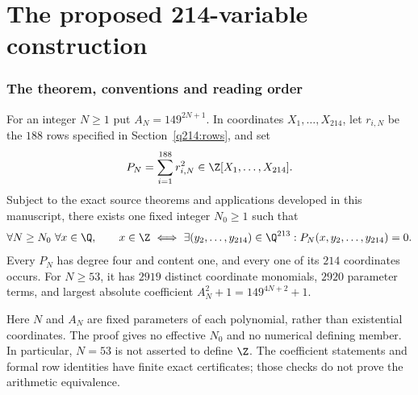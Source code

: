 \maketitle
\begin{abstract}
We present the proposed $214$-variable quartic family obtained by reciprocal
clearing on the shared-trace $224$-coordinate predecessor.  For the fixed
coefficient $A_N=149^{2N+1}$, the polynomial is the sum of squares of $188$
primitive integral quadratic residuals, all printed below.  The proposed
arithmetic conclusion is uniform for every $N$ beyond one fixed ineffective
threshold.  The complete new local, modularity, height and existence arguments
are followed by the full current Version~16 mathematical foundation, including
the inherited elliptic, scalar, prime-selection, pole and aggregate arguments.
The exact coefficient calculation gives $2919$ coordinate monomials, $2920$
parameter terms and height $149^{4N+2}+1$ for $N\ge53$; this is only a
coefficient threshold.  This assembled manuscript is an author proposal for
fresh review and does not itself confer Protocol~D or release acceptance.
\end{abstract}
\tableofcontents
\clearpage
\part{The proposed 214-variable construction}
\section{The theorem, conventions and reading order}\label{q214:main}
\begin{theorem}\label{q214:theorem}
For an integer $N\ge1$ put $A_N=149^{2N+1}$.  In coordinates
$X_1,\ldots,X_{214}$, let $r_{i,N}$ be the $188$ rows specified in
Section~\ref{q214:rows}, and set
\[
 P_N=\sum_{i=1}^{188}r_{i,N}^2\in\Z[X_1,\ldots,X_{214}].
\]
Subject to the exact source theorems and applications developed in this
manuscript, there exists one fixed integer $N_0\ge1$ such that
\[
 \forall N\ge N_0\ \forall x\in\Q,\qquad
 x\in\Z\ \Longleftrightarrow\
 \exists (y_2,\ldots,y_{214})\in\Q^{213}:
 P_N(x,y_2,\ldots,y_{214})=0.
\]
Every $P_N$ has degree four and content one, and every one of its $214$
coordinates occurs.  For $N\ge53$, it has $2919$ distinct coordinate
monomials, $2920$ parameter terms, and largest absolute coefficient
$A_N^2+1=149^{4N+2}+1$.
\end{theorem}
Here $N$ and $A_N$ are fixed parameters of each polynomial, rather than
existential coordinates.  The proof gives no effective $N_0$ and no numerical
defining member.  In particular, $N=53$ is not asserted to define $\Z$.
The coefficient statements and formal row identities have finite exact
certificates; those checks do not prove the arithmetic equivalence.

